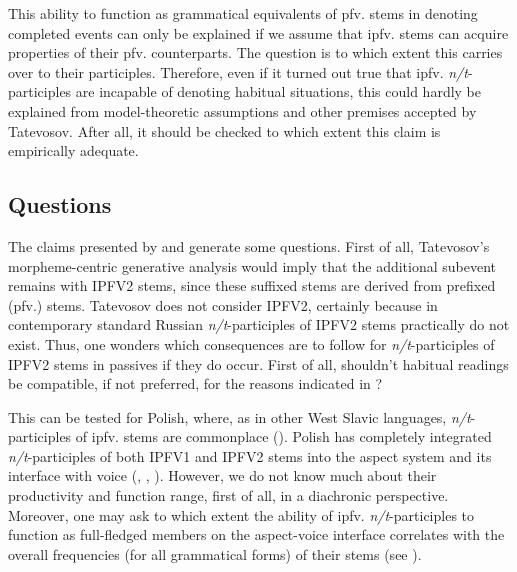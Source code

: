 \documentclass[output=paper]{langscibook}
\begin{document}
\noindent This ability to function as grammatical equivalents of pfv. stems in denoting completed events can only be explained if we assume that ipfv. stems can acquire properties of their pfv. counterparts. The question is to which extent this carries over to their participles. Therefore, even if it turned out true that ipfv. \textit{n/t}-participles are incapable of denoting habitual situations, this could hardly be explained from model-theoretic assumptions and other premises accepted by Tatevosov. After all, it should be checked to which extent this claim is empirically adequate.

\subsection{Questions}\label{wiem:sec:questions}

The claims presented by \citet{Borik.Gehrke2018} and \citet{Tatevosov2015Akcional} generate some questions. First of all, Tatevosov’s morpheme-centric generative analysis would imply that the additional subevent remains with IPFV2 stems, since these suffixed stems are derived from prefixed (pfv.) stems. Tatevosov does not consider IPFV2, certainly because in contemporary standard Russian \textit{n/t}-participles of IPFV2 stems practically do not exist. Thus, one wonders which consequences are to follow for \textit{n/t}-participles of IPFV2 stems in passives if they do occur. First of all, shouldn’t habitual readings be compatible, if not preferred, for the reasons indicated in ?

This can be tested for Polish, where, as in other West Slavic languages, \textit{n/t}-participles of ipfv. stems are commonplace (\citealt[135--138]{Wiemer2017}). Polish has completely integrated \textit{n/t}-participles of both IPFV1 and IPFV2 stems into the aspect system and its interface with voice (\citealt{Lehmann1992}, \citealt{Wiemer1996}, \citealt{Górski2008}). However, we do not know much about their productivity and function range, first of all, in a diachronic perspective. Moreover, one may ask to which extent the ability of ipfv. \textit{n/t}-participles to function as full-fledged members on the aspect-voice interface correlates with the overall frequencies (for all grammatical forms) of their stems (see ).
\end{document}
